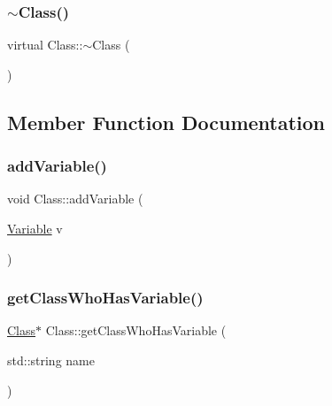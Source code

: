 \mbox{\label{classClass_aa3b9e4e0df41778f3d26777c1eb62898}} 
\subsubsection{\texorpdfstring{$\sim$\+Class()}{~Class()}}
{\footnotesize\ttfamily virtual Class\+::$\sim$\+Class (\begin{DoxyParamCaption}{ }\end{DoxyParamCaption})\hspace{0.3cm}{\ttfamily [virtual]}}



\subsection{Member Function Documentation}
\mbox{\label{classClass_a0c10b6fc7440f229da43f013271c0506}} 
\subsubsection{\texorpdfstring{add\+Variable()}{addVariable()}}
{\footnotesize\ttfamily void Class\+::add\+Variable (\begin{DoxyParamCaption}\item[{\hyperlink{classVariable}{Variable}}]{v }\end{DoxyParamCaption})}

\mbox{\label{classClass_aec836433f28bcfb9bf013ce79f24ba23}} 
\subsubsection{\texorpdfstring{get\+Class\+Who\+Has\+Variable()}{getClassWhoHasVariable()}}
{\footnotesize\ttfamily \hyperlink{classClass}{Class}$\ast$ Class\+::get\+Class\+Who\+Has\+Variable (\begin{DoxyParamCaption}\item[{std\+::string}]{name }\end{DoxyParamCaption})}

